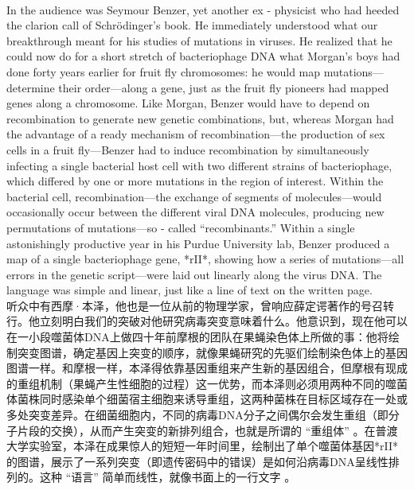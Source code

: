 \documentclass{article}
\begin{document}
\\
In the audience was Seymour Benzer, yet another ex - physicist who had heeded the clarion call of Schrödinger’s book. He immediately understood what our breakthrough meant for his studies of mutations in viruses. He realized that he could now do for a short stretch of bacteriophage DNA what Morgan’s boys had done forty years earlier for fruit fly chromosomes: he would map mutations—determine their order—along a gene, just as the fruit fly pioneers had mapped genes along a chromosome. Like Morgan, Benzer would have to depend on recombination to generate new genetic combinations, but, whereas Morgan had the advantage of a ready mechanism of recombination—the production of sex cells in a fruit fly—Benzer had to induce recombination by simultaneously infecting a single bacterial host cell with two different strains of bacteriophage, which differed by one or more mutations in the region of interest. Within the bacterial cell, recombination—the exchange of segments of molecules—would occasionally occur between the different viral DNA molecules, producing new permutations of mutations—so - called “recombinants.” Within a single astonishingly productive year in his Purdue University lab, Benzer produced a map of a single bacteriophage gene, *rII*, showing how a series of mutations—all errors in the genetic script—were laid out linearly along the virus DNA. The language was simple and linear, just like a line of text on the written page.\\
听众中有西摩·本泽，他也是一位从前的物理学家，曾响应薛定谔著作的号召转行。他立刻明白我们的突破对他研究病毒突变意味着什么。他意识到，现在他可以在一小段噬菌体DNA上做四十年前摩根的团队在果蝇染色体上所做的事：他将绘制突变图谱，确定基因上突变的顺序，就像果蝇研究的先驱们绘制染色体上的基因图谱一样。和摩根一样，本泽得依靠基因重组来产生新的基因组合，但摩根有现成的重组机制（果蝇产生性细胞的过程）这一优势，而本泽则必须用两种不同的噬菌体菌株同时感染单个细菌宿主细胞来诱导重组，这两种菌株在目标区域存在一处或多处突变差异。在细菌细胞内，不同的病毒DNA分子之间偶尔会发生重组（即分子片段的交换），从而产生突变的新排列组合，也就是所谓的 “重组体” 。在普渡大学实验室，本泽在成果惊人的短短一年时间里，绘制出了单个噬菌体基因*rII*的图谱，展示了一系列突变（即遗传密码中的错误）是如何沿病毒DNA呈线性排列的。这种 “语言” 简单而线性，就像书面上的一行文字 。 \\
\end{document}
